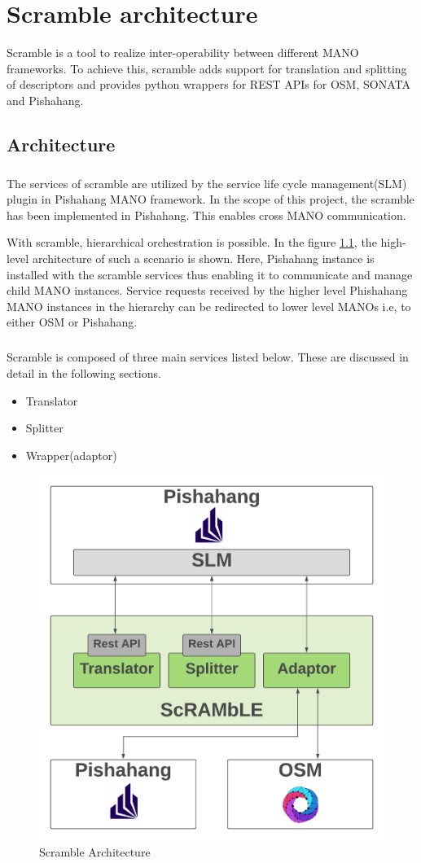 \chapter{Scramble architecture}
\label{ch:Scramble architecture}

Scramble is a tool to realize inter-operability between different MANO frameworks. To achieve this, scramble adds support for translation and splitting of descriptors and provides python wrappers for REST APIs for OSM, SONATA and Pishahang.
\section{Architecture}
\paragraph{}
The services of scramble are utilized by the service life cycle management(SLM) plugin in Pishahang MANO framework. In the scope of this project, the scramble has been implemented in Pishahang. This enables cross MANO communication. 

With scramble, hierarchical orchestration is possible. In the figure \ref{fig:scramble-architecture}, the high-level architecture of such a scenario is shown. Here, Pishahang instance is installed with the scramble services thus enabling it to communicate and manage child MANO instances. Service requests received by the higher level Phishahang MANO instances in the hierarchy can be redirected to lower level MANOs i.e, to either OSM or Pishahang.

\paragraph{}
Scramble is composed of three main services listed below. These are discussed in detail in the following sections.
\begin{itemize}
	\item Translator
	\item Splitter
	\item Wrapper(adaptor)
\end{itemize}


\begin{figure}[h]
	\centering
	\includegraphics[width=0.9\linewidth]{../figures/ScrambleArchitecture}
	\caption{Scramble Architecture}
	\label{fig:scramble-architecture}
\end{figure}
